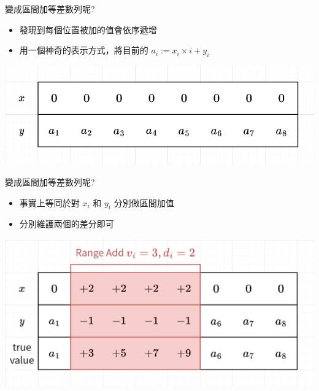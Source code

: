 \documentclass[aspectratio=169]{beamer}
\begin{document}
    \begin{frame}{變成區間加等差數列呢?}
        \begin{itemize}
            \item 發現到每個位置被加的值會依序遞增
            \item 用一個神奇的表示方式，將目前的 $a_i := x_i \times i + y_i$
        \end{itemize}
        \begin{center}
            \includegraphics[scale=0.4]{images/range_add_ap.png}
        \end{center}
    \end{frame}
    
    \begin{frame}{變成區間加等差數列呢?}
        \begin{itemize}
            \item 事實上等同於對 $x_i$ 和 $y_i$ 分別做區間加值
            \item 分別維護兩個的差分即可
        \end{itemize}
        \begin{center}
            \includegraphics[scale=0.4]{images/range_add_ap_2.png}
        \end{center}
    \end{frame}
    
\end{document}
